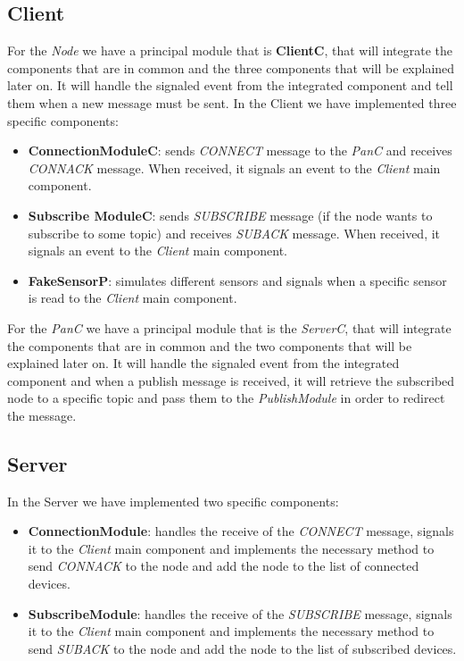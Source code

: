 \documentclass[10pt]{article}
\begin{document}
\subsection{Client}

For the \emph{Node} we have a principal module that is \textbf{ClientC}, that will integrate the components that are in common  and the three components that will be explained later on. It will handle the signaled event from the integrated component and tell them when a new message must be sent.
In the Client we have implemented three specific components:

\begin{itemize}
\item \textbf{ConnectionModuleC}: sends \emph{CONNECT} message to the \emph{PanC} and receives \emph {CONNACK} message. When received, it signals an event to the \emph{Client} main component.
\item \textbf{Subscribe ModuleC}: sends \emph{SUBSCRIBE} message (if the node wants to subscribe to some topic) and receives \emph{SUBACK} message. When received, it signals an event to the \emph{Client} main component.
\item \textbf{FakeSensorP}: simulates different sensors and signals when a specific sensor is read to the \emph{Client} main component.
\end{itemize}

For the \emph{PanC} we have a principal module that is the \emph{ServerC}, that will integrate the components that are in common and the two components that will be explained later on. It will handle the signaled event from the integrated component and when a publish message is received, it will retrieve the subscribed node to a specific topic and pass them to the \emph{PublishModule} in order to redirect the message.
\subsection{Server}
In the Server we have implemented two specific components:
\begin{itemize}
\item \textbf{ConnectionModule}: handles the receive of the \emph{CONNECT} message, signals it to the \emph{Client} main component and implements the necessary method to send \emph{CONNACK} to the node and add the node to the list of connected devices. 
\item \textbf{SubscribeModule}: handles the receive of the \emph{SUBSCRIBE} message, signals it to the \emph{Client} main component and implements the necessary method to send \emph{SUBACK} to the node and add the node to the list of subscribed devices. 
\end{itemize}
\end{document}
